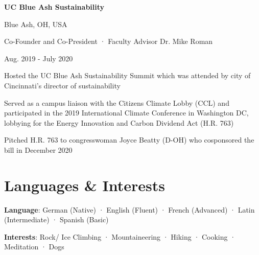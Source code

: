 \documentclass[a4paper,20pt]{article}
\begin{document}
    \begin{minipage}{.75\linewidth} \begin{flushleft}
    		\textbf{UC Blue Ash Sustainability}
    	\end{flushleft} \end{minipage}
    \hfill 
    \begin{minipage}{.20\linewidth}\begin{flushright}
    	 Blue Ash, OH, USA
    	\end{flushright}\end{minipage}
     
    \begin{minipage}{.75\linewidth} \begin{flushleft}
    		Co-Founder and Co-President · Faculty Advisor Dr. Mike Roman
    	\end{flushleft} \end{minipage}
    \hfill 
    \begin{minipage}{.20\linewidth}\begin{flushright}
    	 Aug. 2019 - July 2020
    	\end{flushright}\end{minipage}
        \vspace{-5pt}
	\begin{description}[font=$\bullet$]
	\item{Hosted the UC Blue Ash Sustainability Summit which was attended by city of Cincinnati’s director of sustainability}
        \vspace{-7pt}
        \item{Served as a campus liaison with the Citizens Climate Lobby (CCL) and participated in the 2019 International Climate Conference in Washington DC, lobbying for the Energy Innovation and Carbon Dividend Act (H.R. 763)}
        \vspace{-7pt}
        \item{Pitched H.R. 763 to congresswoman Joyce Beatty (D-OH) who cosponsored the bill in December 2020}
\end{description}

\vspace{-5pt}
\section{Languages \& Interests}
\vspace{5pt}
\begin{description}[font=$\bullet$]
\vspace{-5pt}
\item{\textbf{Language}: German (Native) · English (Fluent) · French (Advanced) · Latin (Intermediate) · Spanish (Basic)}
\vspace{-7pt}
\item{\textbf{Interests}: Rock/ Ice Climbing · Mountaineering · Hiking · Cooking · Meditation · Dogs} 
\end{description}
\end{document}

